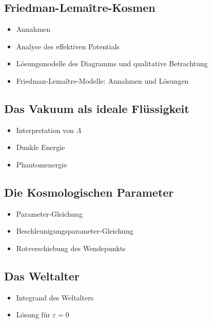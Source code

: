 \documentclass{article}
\begin{document}
\begin{multicols}{2}
    \subsection{Friedman-Lemaître-Kosmen} %
    \label{sub:friedman_lemaître_kosmen}
      \begin{itemize}
        \item Annahmen
        \item Analyse des effektiven Potentials
        \item Lösungsmodelle des Diagramms und qualitative Betrachtung
        \item Friedman-Lemaître-Modelle: Annahmen und Lösungen
      \end{itemize}

    \subsection{Das Vakuum als ideale Flüssigkeit} %
    \label{sub:das_vakuum_als_ideale_flüssigkeit}
      \begin{itemize}
        \item Interpretation von $\Lambda$
        \item Dunkle Energie
        \item Phantomenergie
      \end{itemize}

    \subsection{Die Kosmologischen Parameter} %
    \label{sub:die_kosmologischen_parameter}
      \begin{itemize}
        \item Parameter-Gleichung
        \item Beschleunigungsparameter-Gleichung
        \item Rotverschiebung des Wendepunkts
      \end{itemize}

    \subsection{Das Weltalter} %
    \label{sub:das_weltalter}
      \begin{itemize}
        \item Integrand des Weltalters
        \item Lösung für $ε=0$
      \end{itemize}


\end{multicols}
\end{document}
